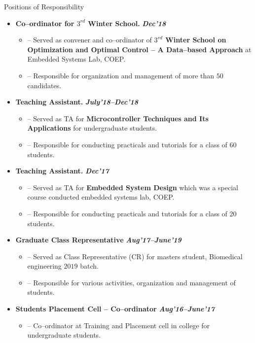 \documentclass[11pt]{resume}
\newenvironment{outerlist}[1][\enskip\textbullet]%
{\begin{itemize}[#1,leftmargin=*]}{\end{itemize}%
	\vspace{-.5\baselineskip}}
\newenvironment{innerlist}[1][\enskip\textbullet]%
{\begin{itemize}[#1,leftmargin=*,parsep=0pt,itemsep=0pt,topsep=0pt,partopsep=0pt]}
	{\end{itemize}}
\begin{document}
\begin{rSection}{Positions of Responsibility}
	\begin{outerlist}
		\item \textbf{Co--ordinator for $ 3^{rd} $ Winter School.} \hfill \textit{\textbf{Dec'18}} 
			\begin{innerlist}
				\item[--] Served as convener and co--ordinator of \textbf{$ 3^{rd} $ Winter School on Optimization and Optimal Control -- A Data--based Approach} at Embedded Systems Lab, COEP.
				\item[--] Responsible for organization and management of  more than $50$ candidates.
			\end{innerlist}
		\item \textbf{Teaching Assistant.} \hfill \textit{\textbf{July'18--Dec'18}}
			\begin{innerlist}
				\item[--] Served as TA for \textbf{Microcontroller Techniques and Its Applications} for undergraduate students.
				\item[--] Responsible for conducting practicals and tutorials for a class of 60 students.
			\end{innerlist}	
		\item \textbf{Teaching Assistant.} \hfill \textit{\textbf{Dec'17}}
			\begin{innerlist}
				\item[--] Served as TA for \textbf{Embedded System Design} which was a special course conducted embedded systems lab, COEP.
				\item[--] Responsible for conducting practicals and tutorials for a class of 20 students.
			\end{innerlist}	
		\item \textbf{Graduate Class Representative} \hfill \textit{\textbf{Aug'17--June'19}}
			\begin{innerlist}
				\item[--] Served as Class Representative (CR) for masters student, Biomedical engineering $ 2019  $ batch.
				\item[--] Responsible for various activities, organization and management of students.
			\end{innerlist}		
		\item \textbf{Students Placement Cell -- Co--ordinator} \hfill \textit{\textbf{Aug'16--June'17}}
			\begin{innerlist}
				\item[--] Co--ordinator at Training and Placement cell in college for undergraduate students. 

\end{innerlist}
\end{outerlist}
\end{rSection}
\end{document}

